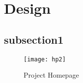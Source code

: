 \clearpage
\section{Design}


\subsection{subsection1}
\lipsum[5-7]
\begin{figure}[h]
    \centering
    \texttt{[image: hp2]}
    \caption{Project Homepage}
    \label{fig:project-homepage}
\end{figure}
